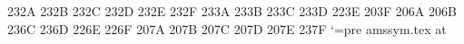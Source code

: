 \newsymbol{}
\newsymbol{}
\newsymbol{}
\newsymbol{}
\newsymbol{}
\newsymbol\nsubseteq 232A
\newsymbol\nsupseteq 232B
\newsymbol\nparallel 232C
\newsymbol\nmid 232D
\newsymbol\nshortmid 232E
\newsymbol\nshortparallel 232F
\newsymbol{}
\newsymbol{}
\newsymbol{}
\newsymbol{}
\newsymbol{}
\newsymbol{}
\newsymbol{}
\newsymbol{}
\newsymbol{}
\newsymbol{}
\newsymbol\nLeftarrow 233A
\newsymbol\nRightarrow 233B
\newsymbol\nLeftrightarrow 233C
\newsymbol\nleftrightarrow 233D
\newsymbol\divideontimes 223E
\newsymbol\varnothing 203F
\newsymbol{}
\newsymbol{}
\newsymbol{}
\newsymbol{}
\newsymbol{}
\newsymbol{}
\newsymbol{}
\newsymbol\gimel 206A
\newsymbol\daleth 206B
\newsymbol\lessdot 236C
\newsymbol\gtrdot 236D
\newsymbol\ltimes 226E
\newsymbol\rtimes 226F
\newsymbol{}
\newsymbol{}
\newsymbol{}
\newsymbol{}
\newsymbol{}
\newsymbol{}
\newsymbol{}
\newsymbol{}
\newsymbol{}
\newsymbol{}
\newsymbol\digamma 207A
\newsymbol\varkappa 207B
\newsymbol\Bbbk 207C
\newsymbol\hslash 207D
\undefine\hbar
\newsymbol\hbar 207E
\newsymbol\backepsilon 237F
\catcode`\@=\csname pre amssym.tex at\endcsname

\endinput
